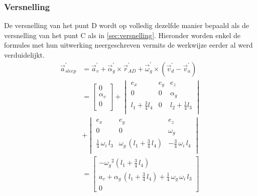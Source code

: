 \subsubsection{Versnelling}
De versnelling van het punt D wordt op volledig dezelfde manier bepaald als de versnelling van het punt C als in \ref{sec:versnelling}. Hieronder worden enkel de formules met hun uitwerking neergeschreven vermits de werkwijze eerder al werd verduidelijkt.
\begin{equation}
\begin{split}
\vec{a}_{sleep}^{'}&=\vec{a}_{v}^{'}+\vec{\alpha}_{g}^{'}\times\vec{r}_{AD}^{'}+\vec{\omega}_{g}^{'}\times(\vec{v}_{d}^{'}-\vec{v}_{a}^{'})\\
&=\begin{bmatrix}
0						\\
\alpha_{v}	\\
0						\\
\end{bmatrix}
+\begin{vmatrix}
e_{x}&e_{y}&e_{z}\\
0&0&\alpha_{g}\\
l_{1}+\frac{3}{4}l_{4}&0&l_{2}+\frac{1}{4}l_{3}\\
\end{vmatrix}\\
&+\begin{vmatrix}
e_{x}&e_{y}&e_{z}\\
0&0&\omega_{g}\\
\frac{1}{4}\,\omega_{i}\,l_{3}&\omega_{g}\, \left( l_{1}+\frac{3}{4}\,l_{4} \right)&-\frac{3}{4}\,\omega_{i}\,l_{4}\\
\end{vmatrix}\\
&=\left[ \begin {array}{c} -{\omega_{g}}^{2} \left( l_{1}+\frac{3}{4}\,l_{4} \right) \\a_{v}+\alpha_{g}\, \left( l_{1}+\frac{3}{4}\,l_{4} \right) +\frac{1}{4}\,\omega_{g}\,\omega_{i}\,l_{3}\\0\end {array} \right]
\label{eq:kin4.7}
\end{split}
\end{equation}
